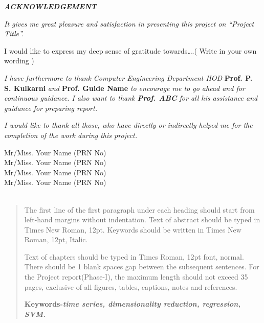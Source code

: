 \documentclass[a4paper, 12pt]{report}
\begin{document}
\begin{frontmatter}
\newpage
\begin{center}
{\Large{\bf{\textit{ACKNOWLEDGEMENT}}\\[2cm]}}
\end{center}
\par \textit{It gives me great pleasure and satisfaction in presenting this project on “Project Title”.} \\
\par I would like to express my deep sense of gratitude towards….( Write in your own wording )\\
\par \textit{I have furthermore to thank Computer Engineering Department HOD}  {\bf Prof. P. S. Kulkarni} \textit{and} {\bf Prof. Guide Name} \textit{to encourage me to go ahead and for continuous guidance. I also want to thank {\bf Prof. ABC} for all his assistance and guidance for preparing report.}\\
\par \textit{I would like to thank all those, who have directly or indirectly helped me for the completion of the work during this project.}
\vspace{0.8in}
\begin{flushright}
Mr/Miss. Your Name (PRN No) \\
Mr/Miss. Your Name (PRN No) \\
Mr/Miss. Your Name (PRN No) \\
Mr/Miss. Your Name (PRN No) \\
\hspace*{0.1in}{VII Semester,\\Computer Engineering}\\
\end{flushright}
\setcounter{page}{1}
\newpage
\tableofcontents
\listoffigures
\listoftables
{}
\begin{abstract}
\par The first line of the first paragraph under each heading should start from left-hand margins without indentation.  Text of abstract should be typed in Times New Roman, 12pt. Keywords should be written in Times New Roman, 12pt, Italic.\\
\par Text of chapters should be typed in Times Roman, 12pt font, normal. There should be 1 blank spaces gap between the subsequent sentences. For the Project report(Phase-I), the maximum length should not exceed 35 pages, exclusive of all figures, tables, captions, notes and references. 
\\
\vspace{0.3cm}

\textbf{Keywords-}\it{\textbf{time series, dimensionality reduction, regression, SVM.}}\\
\end{abstract}
\end{frontmatter}
\end{document}
